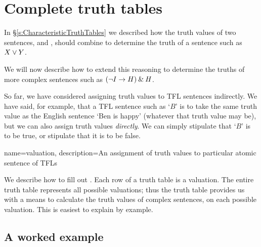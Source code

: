 \chapter{Complete truth tables}
\label{s:CompleteTruthTables}

In \S\ref{s:CharacteristicTruthTables} we described how the truth values of two sentences, \metaX and \metaY, should combine to determine the truth of a sentence such as $X\vee Y$.

We will now describe how to extend this reasoning to determine the truths of more complex sentences such as $(\neg I\rightarrow H)\mathbin{\&} H$.

So far, we have considered assigning truth values to TFL sentences indirectly. We have said, for example, that a TFL sentence such as `$B$' is to take the same truth value as the English sentence `Ben is happy' (whatever that truth value may be), but we can also assign truth values \emph{directly}. We can simply stipulate that `$B$' is to be true, or stipulate that it is to be false.

{
name=valuation,
description={An assignment of \glspl{truth value} to particular atomic \glspl{sentence of TFL}}
}

We describe how to fill out .
Each row of a truth table is a valuation. The entire truth table represents all possible valuations; thus the truth table provides us with a means to calculate the truth values of complex sentences, on each possible valuation. This is easiest to explain by example.

\section{A worked example}

